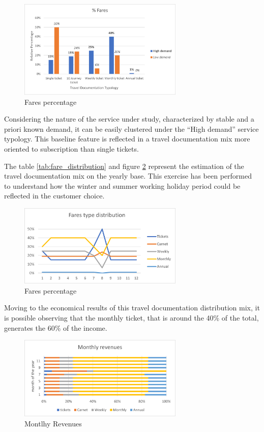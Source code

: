 \begin{figure}[hp]
    \centering
    \includegraphics[width=0.7\textwidth]{Images/financial/fares.png}
    \caption{Fares percentage}
    \label{fig:fares_percentage}
\end{figure}
Considering the nature of the service under study, characterized by stable and a priori known demand, it can be easily clustered under the “High demand” service typology. This baseline feature is reflected in a travel documentation mix more oriented to subscription than single tickets.

The table \ref{tab:fare_distribution} and figure \ref{fig:fares_percentage2} represent the estimation of the travel documentation mix on the yearly base. This exercise has been performed to understand how the winter and summer working holiday period could be reflected in the customer choice.
\begin{figure}[hp]
    \centering
    \includegraphics[width=0.7\textwidth]{Images/financial/fares_type_distribution.png}
    \caption{Fares percentage}
    \label{fig:fares_percentage2}
\end{figure}


Moving to the economical results of this travel documentation distribution mix, it is possible observing that the monthly ticket, that is around the 40\% of the total, generates the 60\% of the income.

\begin{figure}[h]
    \centering
    \includegraphics[width=0.7\textwidth]{Images/financial/monthly_revenues.png}
    \caption{Montlhy Revenues}
    \label{fig:monthly_revenues}
\end{figure}

